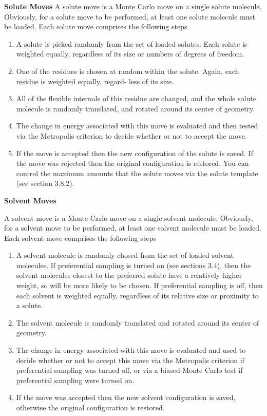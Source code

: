 \documentclass[letterpaper,10pt,english]{sphinxmanual}
\begin{document}
\textbf{Solute Moves}
A solute move is a Monte Carlo move on a single solute molecule. Obviously, for a solute move to be performed, at least one solute molecule must be loaded. Each solute move comprises the following steps
\begin{enumerate}
\item {} 
A solute is picked randomly from the set of loaded solutes. Each solute is weighted equally, regardless of its size or numbers of degrees of freedom.

\item {} 
One of the residues is chosen at random within the solute. Again, each residue is weighted equally, regard- less of its size.

\item {} 
All of the flexible internals of this residue are changed, and the whole solute molecule is randomly translated, and rotated around its center of geometry.

\item {} 
The change in energy associated with this move is evaluated and then tested via the Metropolis criterion to decide whether or not to accept the move.

\item {} 
If the move is accepted then the new configuration of the solute is saved. If the move was rejected then the original configuration is restored. You can control the maximum amounts that the solute moves via the solute template (see section 3.8.2).

\end{enumerate}

\textbf{Solvent Moves}

A solvent move is a Monte Carlo move on a single solvent molecule. Obviously, for a solvent move to be performed, at least one solvent molecule must be loaded. Each solvent move comprises the following steps
\begin{enumerate}
\item {} 
A solvent molecule is randomly chosed from the set of loaded solvent molecules. If preferential sampling is turned on (see sections 3.4), then the solvent molecules closest to the preferred solute have a relatively higher weight, so will be more likely to be chosen. If preferential sampling is off, then each solvent is weighted equally, regardless of its relative size or proximity to a solute.

\item {} 
The solvent molecule is randomly translated and rotated around its center of geometry.

\item {} 
The change in energy associated with this move is evaluated and used to decide whether or not to accept this move via the Metropolis criterion if preferential sampling was turned off, or via a biased Monte Carlo test if preferential sampling were turned on.

\item {} 
If the move was accepted then the new solvent configuration is saved, otherwise the original configuration is restored.

\end{enumerate}
\end{document}
